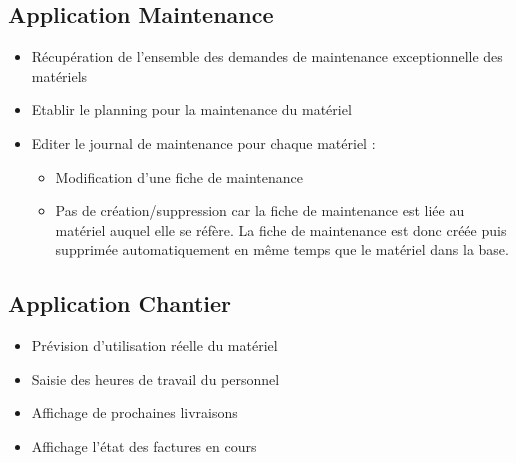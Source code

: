 \documentclass [a4paper] {report}
\begin{document}
\subsection{Application Maintenance}
\begin{itemize}
\item Récupération de l'ensemble des demandes de maintenance exceptionnelle des matériels
\item Etablir le planning pour la maintenance du matériel
\item Editer le journal de maintenance pour chaque matériel :
    \begin{itemize}
    \item Modification d'une fiche de maintenance
    \item Pas de création/suppression car la fiche de maintenance est liée
    au matériel auquel elle se réfère. La fiche de maintenance est donc
    créée puis supprimée automatiquement en même temps que le matériel dans
    la base.
    \end{itemize}
\end{itemize}

\subsection{Application Chantier}
\begin{itemize}
\item Prévision d'utilisation réelle du matériel
\item Saisie des heures de travail du personnel
\item Affichage de prochaines livraisons
\item Affichage l'état des factures en cours
\end{itemize}
\end{document}
